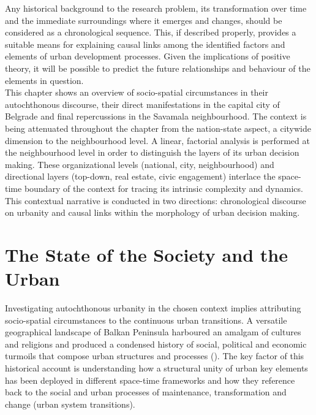 \documentclass[11pt]{report}
\begin{document}
Any historical background to the research problem, its transformation over time and the immediate surroundings where it emerges and changes, should be considered as a chronological sequence. This, if described properly, provides a suitable means for explaining causal links among the identified factors and elements of urban development processes. Given the implications of positive theory, it will be possible to predict the future relationships and behaviour of the elements in question.
\\

This chapter shows an overview of socio-spatial circumstances in their autochthonous discourse, their direct manifestations in the capital city of Belgrade and final repercussions in the Savamala neighbourhood. The context is being attenuated throughout the chapter from the nation-state aspect, a citywide dimension to the neighbourhood level. A linear, factorial analysis is performed at the neighbourhood level in order to distinguish the layers of its urban decision making.
These organizational levels (national, city, neighbourhood) and directional layers (top-down, real estate, civic engagement) interlace the space-time boundary of the context for tracing its intrinsic complexity and dynamics.
This contextual narrative is conducted in two directions: chronological discourse on urbanity and causal links within the morphology of urban decision making. 

\section{The State of the Society and the Urban}


Investigating autochthonous urbanity in the chosen context implies attributing socio-spatial circumstances to the continuous urban transitions. A versatile geographical landscape of Balkan Peninsula harboured an amalgam of cultures and religions and produced a condensed history of social, political and economic turmoils that compose urban structures and processes (\href{Nedovic}{\citealt{nedovicbudic_waves_2006}}).
The key factor of this historical account is understanding how a structural unity of urban key elements has been deployed in different space-time frameworks and how they reference back to the social and urban processes of maintenance, transformation and change (urban system transitions).
\end{document}
